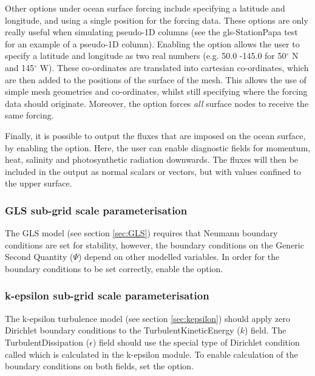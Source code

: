 Other options under ocean surface forcing include specifying a latitude and longitude, and using a single position for the
forcing data. These options are only really useful when simulating pseudo-1D columns (see the gls-StationPapa test for an example
of a pseudo-1D column). Enabling the  option allows the user to specify a latitude and longitude as
two real numbers (e.g. 50.0 -145.0 for 50$^\circ$ N and 145$^\circ$ W). These co-ordinates are translated into cartesian
co-ordinates, which are then added to the positions of the surface of the mesh. This allows the use of simple mesh geometries
and co-ordinates, whilst still specifying where the forcing data should originate. Moreover, the 
option forces \emph{all} surface nodes to receive the same forcing.

Finally, it is possible to output the fluxes that are imposed on the ocean surface, by enabling the
 option. Here, the user can enable diagnostic fields for momentum, heat, salinity and
photosynthetic radiation downwards. The fluxes will then be included in the output as normal scalars or vectors, but with values
confined to the upper surface.

\subsubsection{GLS sub-grid scale parameterisation}\label{sec:BCs:special:gls}

The GLS model (see section \ref{sec:GLS}) requires that Neumann boundary
conditions are set for stability, however, the boundary conditions on the
Generic Second Quantity ($\Psi$) depend on other modelled variables. In
order for the boundary conditions to be set correctly, enable the \linebreak
{}
option.

\subsubsection{k-epsilon sub-grid scale parameterisation} \label{sec:BCs:special:kepsilon}

The k-epsilon turbulence model (see section \ref{sec:kepsilon}) should apply zero
Dirichlet boundary conditions to the TurbulentKineticEnergy ($k$) field. The
TurbulentDissipation ($\epsilon$) field should use the special type of Dirichlet condition
called  which is calculated in the k-epsilon module. To enable
calculation of the boundary conditions on both fields, set the \linebreak
{} option.

